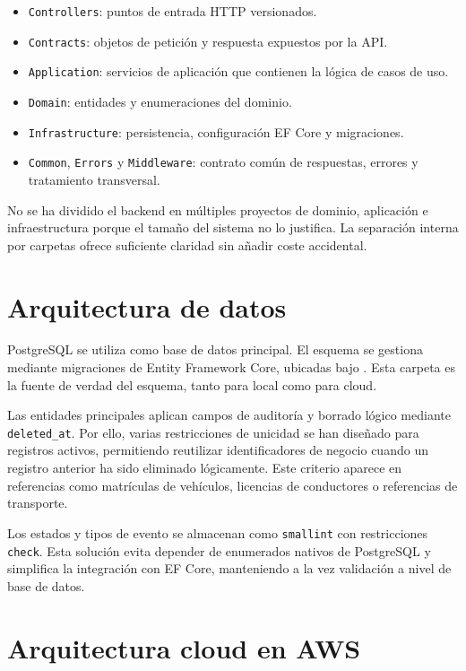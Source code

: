 \begin{itemize}
  \item \texttt{Controllers}: puntos de entrada HTTP versionados.
  \item \texttt{Contracts}: objetos de petición y respuesta expuestos por la API.
  \item \texttt{Application}: servicios de aplicación que contienen la lógica de casos de uso.
  \item \texttt{Domain}: entidades y enumeraciones del dominio.
  \item \texttt{Infrastructure}: persistencia, configuración EF Core y migraciones.
  \item \texttt{Common}, \texttt{Errors} y \texttt{Middleware}: contrato común de respuestas, errores y tratamiento transversal.
\end{itemize}

No se ha dividido el backend en múltiples proyectos de dominio, aplicación e infraestructura porque el tamaño del sistema no lo justifica. La separación interna por carpetas ofrece suficiente claridad sin añadir coste accidental.

\section{Arquitectura de datos}
\label{sec:arquitectura-datos}

PostgreSQL se utiliza como base de datos principal. El esquema se gestiona mediante migraciones de Entity Framework Core, ubicadas bajo . Esta carpeta es la fuente de verdad del esquema, tanto para local como para cloud.

Las entidades principales aplican campos de auditoría y borrado lógico mediante \texttt{deleted\_at}. Por ello, varias restricciones de unicidad se han diseñado para registros activos, permitiendo reutilizar identificadores de negocio cuando un registro anterior ha sido eliminado lógicamente. Este criterio aparece en referencias como matrículas de vehículos, licencias de conductores o referencias de transporte.

Los estados y tipos de evento se almacenan como \texttt{smallint} con restricciones \texttt{check}. Esta solución evita depender de enumerados nativos de PostgreSQL y simplifica la integración con EF Core, manteniendo a la vez validación a nivel de base de datos.

\section{Arquitectura cloud en AWS}
\label{sec:arquitectura-cloud}

